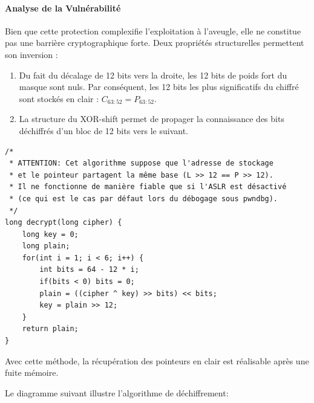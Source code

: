 \paragraph{Analyse de la Vulnérabilité}
Bien que cette protection complexifie l'exploitation à l'aveugle, elle ne constitue pas une barrière cryptographique forte. Deux propriétés structurelles permettent son inversion :
\begin{enumerate}
    \item Du fait du décalage de 12 bits vers la droite, les 12 bits de poids fort du masque sont nuls. Par conséquent, les 12 bits les plus significatifs du chiffré sont stockés en clair : $C_{63:52} = P_{63:52}$.
    \item La structure du XOR-shift permet de propager la connaissance des bits déchiffrés d'un bloc de 12 bits vers le suivant.
\end{enumerate}

\begin{verbatim}
/* 
 * ATTENTION: Cet algorithme suppose que l'adresse de stockage 
 * et le pointeur partagent la même base (L >> 12 == P >> 12).
 * Il ne fonctionne de manière fiable que si l'ASLR est désactivé 
 * (ce qui est le cas par défaut lors du débogage sous pwndbg).
 */
long decrypt(long cipher) {
    long key = 0;
    long plain;
    for(int i = 1; i < 6; i++) {
        int bits = 64 - 12 * i;
        if(bits < 0) bits = 0;
        plain = ((cipher ^ key) >> bits) << bits;
        key = plain >> 12;
    }
    return plain;
}
\end{verbatim}

Avec cette méthode, la récupération des pointeurs en clair est réalisable après une fuite mémoire.

Le diagramme suivant illustre l'algorithme de déchiffrement:

